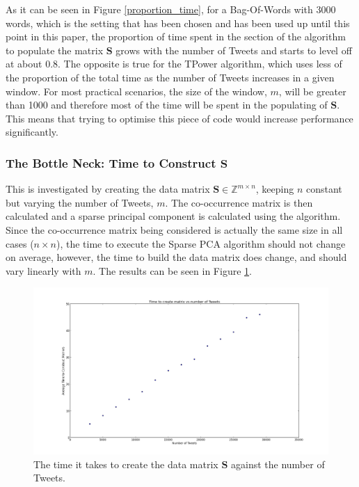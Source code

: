 \documentclass[11pt,a4paper]{article}
\newcommand{\inintmxn}{\in \mathbb{Z}^{m\times n}}
\newcommand{\smat}{\mathbf{S}}
\begin{document}
As it can be seen in Figure \ref{proportion_time}, for a Bag-Of-Words with 3000 words, which is the setting that has been chosen and has been used up until this point in this paper, the proportion of time spent in the section of the algorithm to populate the matrix $\smat$ grows with the number of Tweets and starts to level off at about 0.8. The opposite is true for the TPower algorithm, which uses less of the proportion of the total time as the number of Tweets increases in a given window. For most practical scenarios, the size of the window, $m$, will be greater than 1000 and therefore most of the time will be spent in the populating of $\smat$. This means that trying to optimise this piece of code would increase performance significantly.

\subsubsection{The Bottle Neck: Time to Construct $\smat$}

This is investigated by creating the data matrix $\smat \inintmxn$, keeping $n$ constant but varying the number of Tweets, $m$. The co-occurrence matrix is then calculated and a sparse principal component is calculated using the algorithm. Since the co-occurrence matrix being considered is actually the same size in all cases ($n \times n$), the time to execute the Sparse PCA algorithm should not change on average, however, the time to build the data matrix does change, and should vary linearly with $m$. The results can be seen in Figure \ref{time_matrix_construction}.

\begin{figure}[H]
\centering
\includegraphics[scale=0.30]{Time_Matrix_Construction.png}
\caption{The time it takes to create the data matrix $\smat$ against the number of Tweets.}
\label{time_matrix_construction}
\end{figure}
\end{document}
